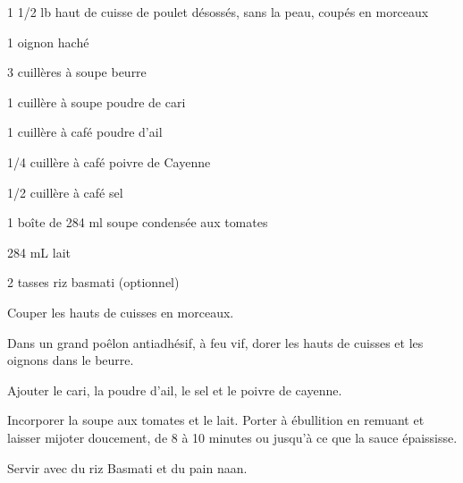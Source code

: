 


\totaltime{}


\begin{ingredients}
    \item 1 1/2 lb haut de cuisse de poulet désossés, sans la peau, coupés en morceaux
    \item 1 oignon haché
    \item 3 cuillères à soupe beurre
    \item 1 cuillère à soupe poudre de cari
    \item 1 cuillère à café poudre d'ail
    \item 1/4 cuillère à café poivre de Cayenne
    \item 1/2 cuillère à café sel
    \item 1 boîte de 284 ml soupe condensée aux tomates
    \item 284 mL lait
    \item 2 tasses riz basmati (optionnel)
\end{ingredients}

\begin{steps}
    \item Couper les hauts de cuisses en morceaux.
    \item Dans un grand poêlon antiadhésif, à feu vif, dorer les hauts de cuisses et les oignons dans le beurre.
    \item Ajouter le cari, la poudre d’ail, le sel et le poivre de cayenne.
    \item Incorporer la soupe aux tomates et le lait. Porter à ébullition en remuant et laisser mijoter doucement, de 8 à 10 minutes ou jusqu’à ce que la sauce épaississe.
    \item Servir avec du riz Basmati et du pain naan.
\end{steps}
